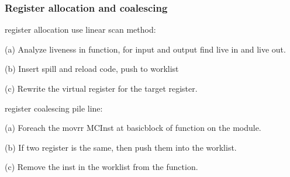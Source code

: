 \subsubsection{Register allocation and coalescing}

register allocation use linear scan method:\par
(a) Analyze liveness in function, for input and output find live in and live out.\par
(b) Insert spill and reload code, push to worklist\par
(c) Rewrite the virtual register for the target register.

register coalescing pile line:

(a) Foreach the movrr MCInst at basicblock of function on the module.\par
(b) If two register is the same, then push them into the worklist.\par
(c) Remove the inst in the worklist from the function.\par